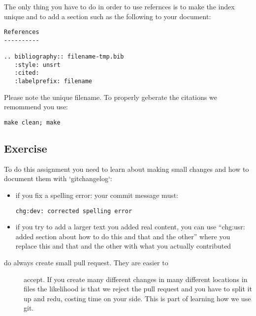 The only thing you have to do in order to use refernces is to make the
index unique and to add a section such as the following to your
document:

\begin{verbatim}
References
----------

.. bibliography:: filename-tmp.bib
   :style: unsrt
   :cited:
   :labelprefix: filename
\end{verbatim}

Please note the unique filename. To properly geberate the citations we
remommend you use:

\begin{verbatim}
make clean; make
\end{verbatim}

\subsection{Exercise}\label{exercise}

To do this assignment you need to learn about making small changes and
how to document them with `gitchangelog`:

\begin{itemize}
\item
  if you fix a spelling error: your commit message must:

\begin{verbatim}
chg:dev: corrected spelling error
\end{verbatim}
\item
  if you try to add a larger text you added real content, you can use
  ``chg:usr: added section about how to do this and that and the other''
  where you replace this and that and the other with what you actually
  contributed
\end{itemize}

\begin{description}
\item[do always create small pull request. They are easier to]
accept. If you create many different changes in many different locations
in files the likelihood is that we reject the pull request and you have
to split it up and redu, costing time on your side. This is part of
learning how we use git.
\end{description}

